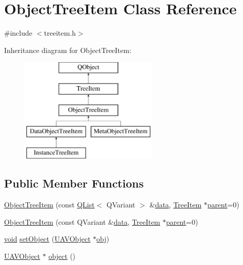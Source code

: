 \hypertarget{class_object_tree_item}{\section{Object\-Tree\-Item Class Reference}
\label{class_object_tree_item}
}


{\ttfamily \#include $<$treeitem.\-h$>$}

Inheritance diagram for Object\-Tree\-Item\-:\begin{figure}[H]
\begin{center}
\leavevmode
\includegraphics[height=5.000000cm]{class_object_tree_item}
\end{center}
\end{figure}
\subsection*{Public Member Functions}
\begin{DoxyCompactItemize}
\item 
\hyperlink{group___u_a_v_object_browser_plugin_ga5e60cc8ad10984411923efa677042087}{Object\-Tree\-Item} (const \hyperlink{class_q_list}{Q\-List}$<$ Q\-Variant $>$ \&\hyperlink{glext_8h_a8850df0785e6fbcc2351af3b686b8c7a}{data}, \hyperlink{class_tree_item}{Tree\-Item} $\ast$\hyperlink{group___u_a_v_object_browser_plugin_gaa3a7ba624312b6be70872634db291881}{parent}=0)
\item 
\hyperlink{group___u_a_v_object_browser_plugin_gafad6566ac62ae971f53230a0ec190070}{Object\-Tree\-Item} (const Q\-Variant \&\hyperlink{glext_8h_a8850df0785e6fbcc2351af3b686b8c7a}{data}, \hyperlink{class_tree_item}{Tree\-Item} $\ast$\hyperlink{group___u_a_v_object_browser_plugin_gaa3a7ba624312b6be70872634db291881}{parent}=0)
\item 
\hyperlink{group___u_a_v_objects_plugin_ga444cf2ff3f0ecbe028adce838d373f5c}{void} \hyperlink{group___u_a_v_object_browser_plugin_ga5484d17e330931614680cfac5a1d1d3d}{set\-Object} (\hyperlink{class_u_a_v_object}{U\-A\-V\-Object} $\ast$\hyperlink{glext_8h_a0c0d4701a6c89f4f7f0640715d27ab26}{obj})
\item 
\hyperlink{class_u_a_v_object}{U\-A\-V\-Object} $\ast$ \hyperlink{group___u_a_v_object_browser_plugin_gac539f66530cd71a2b0b562cb5e2accc7}{object} ()
\end{DoxyCompactItemize}
